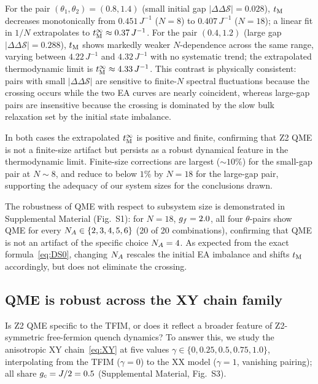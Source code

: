 For the pair $(\theta_1,\theta_2) = (0.8, 1.4)$ (small initial gap
$|\Delta\Delta\mathcal{S}| = 0.028$), $t_{\rm M}$ decreases monotonically from
$0.451\,J^{-1}$ ($N=8$) to $0.407\,J^{-1}$ ($N=18$); a linear fit in $1/N$
extrapolates to $t_{\rm M}^\infty \approx 0.37\,J^{-1}$.
For the pair $(0.4, 1.2)$ (large gap $|\Delta\Delta\mathcal{S}| = 0.288$),
$t_{\rm M}$ shows markedly weaker $N$-dependence across the same range, varying
between $4.22\,J^{-1}$ and $4.32\,J^{-1}$ with no systematic trend;
the extrapolated thermodynamic limit is $t_{\rm M}^\infty \approx 4.33\,J^{-1}$.
This contrast is physically consistent: pairs with small $|\Delta\Delta\mathcal{S}|$
are sensitive to finite-$N$ spectral fluctuations because the crossing occurs
while the two EA curves are nearly coincident, whereas large-gap pairs are
insensitive because the crossing is dominated by the slow bulk relaxation
set by the initial state imbalance.

In both cases the extrapolated $t_{\rm M}^\infty$ is positive and finite, confirming that
Z2 QME is not a finite-size artifact but persists as a robust dynamical feature in
the thermodynamic limit.
Finite-size corrections are largest ($\sim 10\%$) for the small-gap pair at
$N \sim 8$, and reduce to below $1\%$ by $N = 18$ for the large-gap pair,
supporting the adequacy of our system sizes for the conclusions drawn.

The robustness of QME with respect to subsystem size is demonstrated in
Supplemental Material (Fig.~S1): for $N = 18$, $g_f = 2.0$, all four
$\theta$-pairs show QME for every $N_A \in \{2, 3, 4, 5, 6\}$
(20 of 20 combinations), confirming that QME is not an artifact of
the specific choice $N_A = 4$.
As expected from the exact formula~\eqref{eq:DS0}, changing $N_A$ rescales
the initial EA imbalance and shifts $t_{\rm M}$ accordingly, but does not eliminate
the crossing.

\subsection{QME is robust across the XY chain family}
\label{sec:xy}

Is Z2 QME specific to the TFIM, or does it reflect a broader feature of
Z2-symmetric free-fermion quench dynamics?
To answer this, we study the anisotropic XY chain~\eqref{eq:XY} at five values
$\gamma \in \{0, 0.25, 0.5, 0.75, 1.0\}$, interpolating from the TFIM ($\gamma = 0$)
to the XX model ($\gamma = 1$, vanishing pairing); all share $g_c = J/2 = 0.5$
(Supplemental Material, Fig.~S3).


